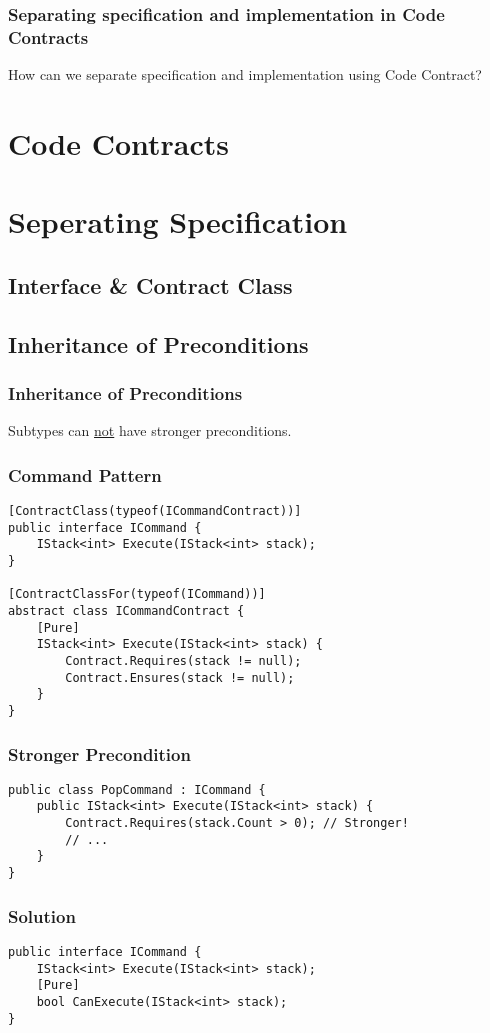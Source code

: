 

\begin{frame}
    \frametitle{Separating specification and implementation in Code Contracts}

    How can we separate specification and implementation using Code Contract?
\end{frame}

\section{Code Contracts}



\section{Seperating Specification}

\subsection{Interface \& Contract Class}



\subsection{Inheritance of Preconditions}

\begin{frame}
    \frametitle{Inheritance of Preconditions}

    Subtypes can \underline{not} have stronger preconditions.
\end{frame}

\begin{frame}[fragile]
    \frametitle{Command Pattern}

    \begin{verbatim}
[ContractClass(typeof(ICommandContract))]
public interface ICommand {
    IStack<int> Execute(IStack<int> stack);
}

[ContractClassFor(typeof(ICommand))]
abstract class ICommandContract {
    [Pure]
    IStack<int> Execute(IStack<int> stack) {
        Contract.Requires(stack != null);
        Contract.Ensures(stack != null);
    }
}
    \end{verbatim}
\end{frame}

\begin{frame}[fragile]
    \frametitle{Stronger Precondition}

    \begin{verbatim}
public class PopCommand : ICommand {
    public IStack<int> Execute(IStack<int> stack) {
        Contract.Requires(stack.Count > 0); // Stronger!
        // ...
    }
}
    \end{verbatim}
\end{frame}

\begin{frame}[fragile]
    \frametitle{Solution}

    \begin{verbatim}
public interface ICommand {
    IStack<int> Execute(IStack<int> stack);
    [Pure]
    bool CanExecute(IStack<int> stack);
}
    \end{verbatim}
\end{frame}


